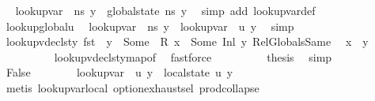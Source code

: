 \begin{isabellebody}
\ \isamarkupfalse%
\ {\isachardoublequoteopen}lookup{\isacharunderscore}{\kern0pt}var\ {\isasymLambda}\ ns\ y\ {\isacharequal}{\kern0pt}\ {\isacharparenleft}{\kern0pt}global{\isacharunderscore}{\kern0pt}state\ ns{\isacharparenright}{\kern0pt}\ y{\isachardoublequoteclose}\ \isamarkupfalse%
\ {\isacharparenleft}{\kern0pt}simp\ add{\isacharcolon}{\kern0pt}\ lookup{\isacharunderscore}{\kern0pt}var{\isacharunderscore}{\kern0pt}def{\isacharparenright}{\kern0pt}\isanewline
\ \ \ \ \ \ \isamarkupfalse%
\ lookup{\isacharunderscore}{\kern0pt}global{\isacharunderscore}{\kern0pt}u\ \isamarkupfalse%
\ {\isachardoublequoteopen}lookup{\isacharunderscore}{\kern0pt}var\ {\isasymLambda}\ ns\ y\ {\isacharequal}{\kern0pt}\ lookup{\isacharunderscore}{\kern0pt}var\ {\isasymLambda}{\isacharprime}{\kern0pt}\ {\isacharquery}{\kern0pt}u\ y{\isachardoublequoteclose}\ \isamarkupfalse%
\ simp\isanewline
\ \ \ \ \ \ \isamarkupfalse%
\ \isamarkupfalse%
\ {\isacartoucheopen}lookup{\isacharunderscore}{\kern0pt}vdecls{\isacharunderscore}{\kern0pt}ty\ {\isacharparenleft}{\kern0pt}fst\ {\isasymLambda}{\isacharprime}{\kern0pt}{\isacharparenright}{\kern0pt}\ y\ {\isacharequal}{\kern0pt}\ Some\ {\isasymtau}{\isacartoucheclose}\ {\isacartoucheopen}R\ x\ {\isacharequal}{\kern0pt}\ Some\ {\isacharparenleft}{\kern0pt}Inl\ y{\isacharparenright}{\kern0pt}{\isacartoucheclose}\ RelGlobalsSame\ \isamarkupfalse%
\ {\isachardoublequoteopen}x\ {\isacharequal}{\kern0pt}\ y{\isachardoublequoteclose}\isanewline
\ \ \ \ \ \ \ \ \isamarkupfalse%
\ lookup{\isacharunderscore}{\kern0pt}vdecls{\isacharunderscore}{\kern0pt}ty{\isacharunderscore}{\kern0pt}map{\isacharunderscore}{\kern0pt}of\ \isamarkupfalse%
\ fastforce\isanewline
\ \ \ \ \ \ \isamarkupfalse%
\ \isamarkupfalse%
\ {\isacharquery}{\kern0pt}thesis\ \isamarkupfalse%
\ simp\isanewline
\ \ \ \ \isamarkupfalse%
\isanewline
\ \ \ \ \ \ \isamarkupfalse%
\ False\isanewline
\ \ \ \ \ \ \isamarkupfalse%
\ {\isachardoublequoteopen}lookup{\isacharunderscore}{\kern0pt}var\ {\isasymLambda}{\isacharprime}{\kern0pt}\ {\isacharquery}{\kern0pt}u\ y\ {\isacharequal}{\kern0pt}\ local{\isacharunderscore}{\kern0pt}state\ {\isacharquery}{\kern0pt}u\ y{\isachardoublequoteclose}\isanewline
\ \ \ \ \ \ \ \ \isamarkupfalse%
\ {\isacharparenleft}{\kern0pt}metis\ lookup{\isacharunderscore}{\kern0pt}var{\isacharunderscore}{\kern0pt}local\ option{\isachardot}{\kern0pt}exhaust{\isacharunderscore}{\kern0pt}sel\ prod{\isachardot}{\kern0pt}collapse{\isacharparenright}{\kern0pt}\ \ \ \ \ \ \isanewline

\end{isabellebody}
